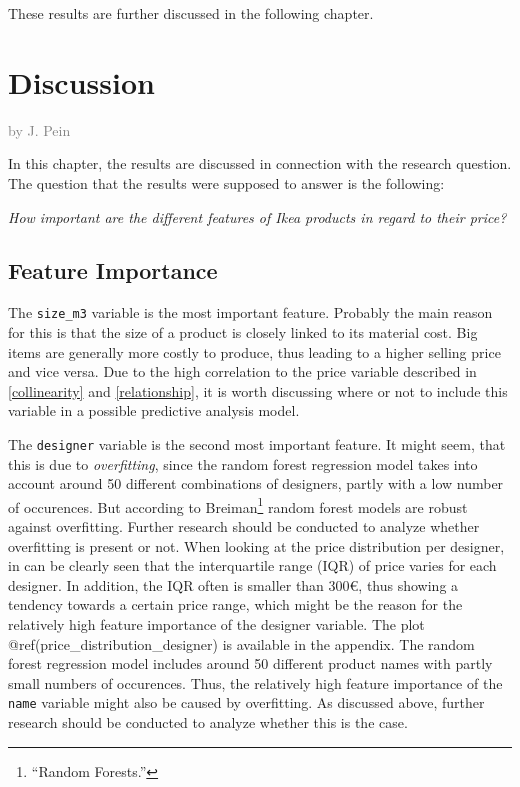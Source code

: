 \documentclass[a4paper, nobind]{templates/ociamthesis}
\begin{document}
These results are further discussed in the following chapter.

\hypertarget{discussion}{%
\chapter{Discussion}\label{discussion}}

\hfill\textcolor{gray}{by J. Pein}

In this chapter, the results are discussed in connection with the research question. The question that the results were supposed to answer is the following:

\emph{How important are the different features of Ikea products in regard to their price?}

\hypertarget{feature-importance-1}{%
\section{Feature Importance}\label{feature-importance-1}}

The \texttt{size\_m3} variable is the most important feature. Probably the main reason for this is that the size of a product is closely linked to its material cost. Big items are generally more costly to produce, thus leading to a higher selling price and vice versa. Due to the high correlation to the price variable described in \ref{collinearity} and \ref{relationship}, it is worth discussing where or not to include this variable in a possible predictive analysis model.

The \texttt{designer} variable is the second most important feature. It might seem, that this is due to \emph{overfitting}, since the random forest regression model takes into account around 50 different combinations of designers, partly with a low number of occurences. But according to Breiman\footnote{``Random Forests.''} random forest models are robust against overfitting. Further research should be conducted to analyze whether overfitting is present or not.
When looking at the price distribution per designer, in can be clearly seen that the interquartile range (IQR) of price varies for each designer. In addition, the IQR often is smaller than 300€, thus showing a tendency towards a certain price range, which might be the reason for the relatively high feature importance of the designer variable. The plot @ref(price\_distribution\_designer) is available in the appendix.
The random forest regression model includes around 50 different product names with partly small numbers of occurences. Thus, the relatively high feature importance of the \texttt{name} variable might also be caused by overfitting. As discussed above, further research should be conducted to analyze whether this is the case.
\end{document}
